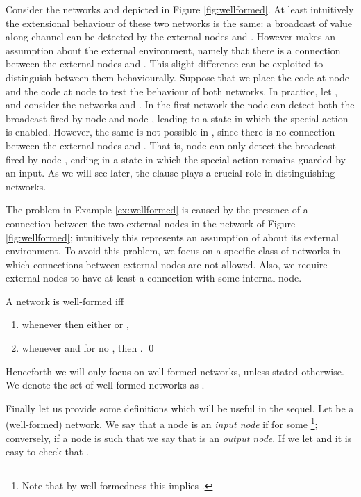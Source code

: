 \documentclass{LMCS}
\begin{document}
\begin{exa}
\label{ex:wellformed}
Consider the networks  and  depicted in 
Figure \ref{fig:wellformed}. At least intuitively the extensional 
behaviour of these two networks is the same: a broadcast of 
value  along channel  can be detected by the external nodes 
 and . However  makes an assumption about the
external environment, namely that there is a connection between
the external nodes  and . This slight difference 
can be  exploited to distinguish between them behaviourally.
 Suppose that we place the code  at 
node  and the code  at 
node  to test the behaviour of both networks. 
In practice, let , and consider the 
networks  and 
. 
In the first network the node  can detect both the 
broadcast fired by node  and node , leading to 
a state in which the special action  is enabled. 
However, the same is not possible in , since there 
is no connection between the external nodes  and . 
That is, node  can only detect the broadcast fired by 
node , ending in a state in which the special action 
 remains guarded by an input. As we will see later, 
the clause  plays a crucial role in distinguishing 
networks.
\end{exa}

The problem in  Example \ref{ex:wellformed} is caused 
by the presence of a connection between the two 
external nodes in the network  
of Figure \ref{fig:wellformed};
intuitively this represents an assumption of 
 about its external environment. To avoid this 
problem, we focus on a specific 
class of networks in which connections between 
external nodes are not allowed. Also, we 
require external nodes to have at least a connection 
with some internal node.

\begin{defi}
\label{def:well.formed}
A network  is well-formed iff 
\begin{enumerate}[label=(\roman*)]
\item whenever  then 
either  or ,
\item whenever  and  
for no , then . 
\qed
\end{enumerate}
\end{defi}
\noindent 
Henceforth we will only focus on well-formed networks, unless stated otherwise. 
We denote the set of well-formed networks as .

Finally let us provide some definitions which will be useful in the sequel.
Let  be a (well-formed) network. We say that a 
node  is an \emph{input node} if  for some \footnote{Note that by well-formedness this implies 
.}; conversely, if a node  is 
such that  we say 
that  is an \emph{output node}. If we let  and  it is easy to check that 
.
\end{document}
